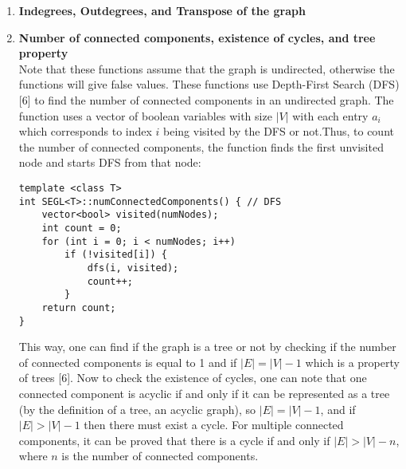 \documentclass[a4paper,12pt]{article}
\begin{document}
\begin{enumerate}
\item \textbf{Indegrees, Outdegrees, and Transpose of the graph}\\
\item \textbf{Number of connected components, existence of cycles, and tree property\\}
Note that these functions assume that the graph is undirected, otherwise the functions will give false values. These functions use Depth-First Search (DFS)[6] to find the number of connected components in an undirected graph. The function uses a vector of boolean variables with size $|V|$ with each entry $a_i$ which corresponds to index $i$ being visited by the DFS or not.Thus, to count the number of connected components, the function finds the first unvisited node and starts DFS from that node:
\begin{lstlisting}
template <class T>
int SEGL<T>::numConnectedComponents() { // DFS
	vector<bool> visited(numNodes);
	int count = 0;
	for (int i = 0; i < numNodes; i++)
		if (!visited[i]) {
			dfs(i, visited);
			count++;
		}
	return count;
}
\end{lstlisting}
This way, one can find if the graph is a tree or not by checking if the number of connected components is equal to 1 and if $|E|=|V|-1$ which is a property of trees [6]. Now to check the existence of cycles, one can note that one connected component is acyclic if and only if it can be represented as a tree (by the definition of a tree, an acyclic graph), so $|E|=|V|-1$, and if $|E|>|V|-1$ then there must exist a cycle. For multiple connected components, it can be proved that there is a cycle if and only if $|E|>|V|-n$, where $n$ is the number of connected components.


\end{enumerate}
\end{document}

